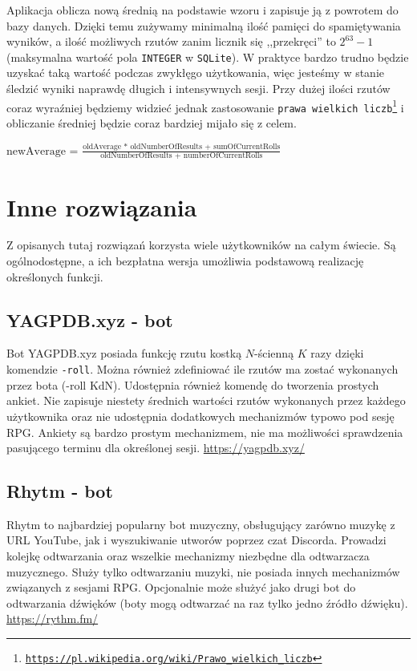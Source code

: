 \documentclass[shortabstract,inz]{iithesis}
\begin{document}
			
	
			Aplikacja oblicza nową średnią na podstawie wzoru i zapisuje ją z powrotem do bazy danych. Dzięki temu zużywamy minimalną ilość pamięci do spamiętywania wyników, a ilość możliwych rzutów zanim licznik się ,,przekręci'' to \(2^{63} - 1\) (maksymalna wartość pola \texttt{INTEGER} w \texttt{SQLite}). W praktyce bardzo trudno będzie uzyskać taką wartość podczas zwykłęgo użytkowania, więc jesteśmy w stanie śledzić wyniki naprawdę długich i intensywnych sesji. Przy dużej ilości rzutów coraz wyraźniej będziemy widzieć jednak zastosowanie \texttt{prawa wielkich liczb\footnote{\url{https://pl.wikipedia.org/wiki/Prawo_wielkich_liczb}}} i obliczanie średniej będzie coraz bardziej mijało się z celem.
			
			\begin{center}
				\(\textrm{newAverage = } \frac{\textrm{oldAverage * oldNumberOfResults + sumOfCurrentRolls}}{\textrm{oldNumberOfResults + numberOfCurrentRolls}}\)
			\end{center}		
		
	\chapter{Inne rozwiązania}	
		Z opisanych tutaj rozwiązań korzysta wiele użytkowników na całym świecie. Są ogólnodostępne, a ich bezpłatna wersja umożliwia podstawową realizację określonych funkcji. 
		\section{YAGPDB.xyz - bot}
		Bot YAGPDB.xyz posiada funkcję rzutu kostką \(N\)-ścienną \(K\) razy dzięki komendzie \texttt{-roll}. Można również zdefiniować ile rzutów ma zostać wykonanych przez bota (-roll KdN). Udostępnia również komendę do tworzenia prostych ankiet. Nie zapisuje niestety średnich wartości rzutów wykonanych przez każdego użytkownika oraz nie udostępnia dodatkowych mechanizmów typowo pod sesję RPG. Ankiety są bardzo prostym mechanizmem, nie ma możliwości sprawdzenia pasującego terminu dla określonej sesji. \url{https://yagpdb.xyz/}
		\section{Rhytm - bot}
		Rhytm to najbardziej popularny bot muzyczny, obsługujący zarówno muzykę z URL YouTube, jak i wyszukiwanie utworów poprzez czat Discorda. Prowadzi kolejkę odtwarzania oraz wszelkie mechanizmy niezbędne dla odtwarzacza muzycznego. Służy tylko odtwarzaniu muzyki, nie posiada innych mechanizmów związanych z sesjami RPG. Opcjonalnie może służyć jako drugi bot do odtwarzania dźwięków (boty mogą odtwarzać na raz tylko jedno źródło dźwięku). \url{https://rythm.fm/}
\end{document}
